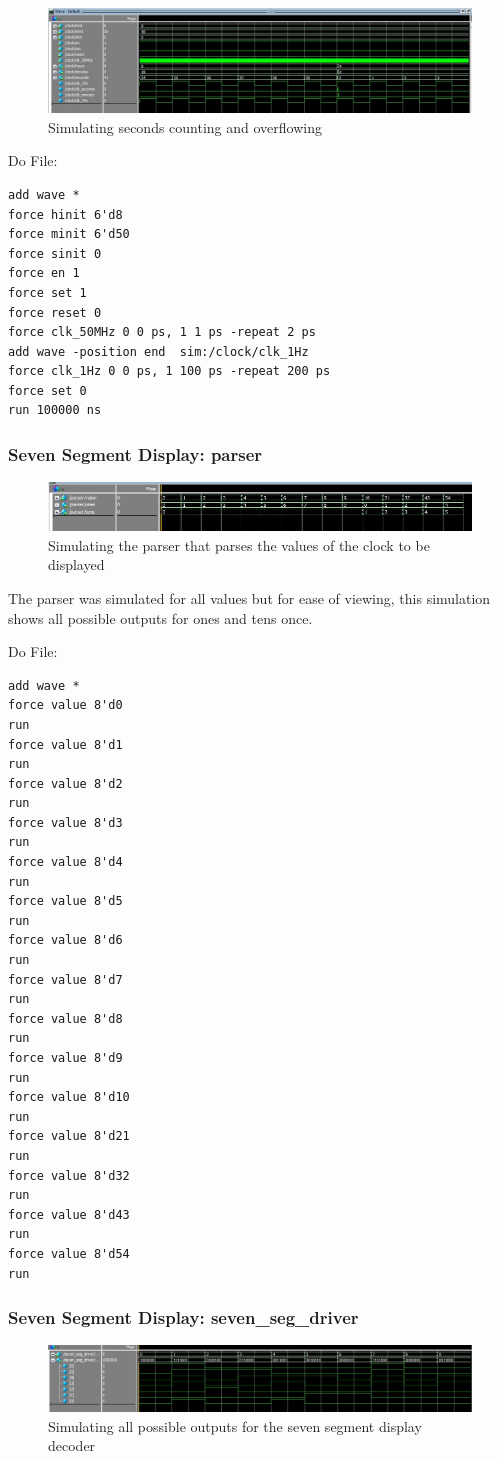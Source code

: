 \documentclass[a4paper]{article}
\begin{document}
\begin{figure}[H]
    \includegraphics[width=0.8 \linewidth]{images/clock_sim3.JPG}
    \caption{Simulating seconds counting and overflowing}
    \label{clock_sim3}
\end{figure}

Do File:
\begin{Verbatim}
add wave *
force hinit 6'd8
force minit 6'd50
force sinit 0
force en 1
force set 1
force reset 0
force clk_50MHz 0 0 ps, 1 1 ps -repeat 2 ps
add wave -position end  sim:/clock/clk_1Hz
force clk_1Hz 0 0 ps, 1 100 ps -repeat 200 ps
force set 0
run 100000 ns

\end{Verbatim}

\subsubsection{Seven Segment Display: parser}
\begin{figure}[H]
    \includegraphics[width=0.8 \linewidth]{images/parser_sim.JPG}
    \caption{Simulating the parser that parses the values of the clock to be displayed}
    \label{parser_sim}
\end{figure}
The parser was simulated for all values but for ease of viewing, this simulation shows all possible outputs for ones and tens once.

Do File:
\begin{Verbatim}
add wave *
force value 8'd0
run
force value 8'd1
run
force value 8'd2
run
force value 8'd3
run
force value 8'd4
run
force value 8'd5
run
force value 8'd6
run
force value 8'd7
run
force value 8'd8
run
force value 8'd9
run
force value 8'd10
run
force value 8'd21
run
force value 8'd32
run
force value 8'd43
run
force value 8'd54
run

\end{Verbatim}

\subsubsection{Seven Segment Display: seven_seg_driver}
\begin{figure}[H]
    \includegraphics[width=0.8 \linewidth]{images/seven_segment_driver_sim.JPG}
    \caption{Simulating all possible outputs for the seven segment display decoder}
    \label{seven_segment_driver_sim}
\end{figure}
\end{document}
